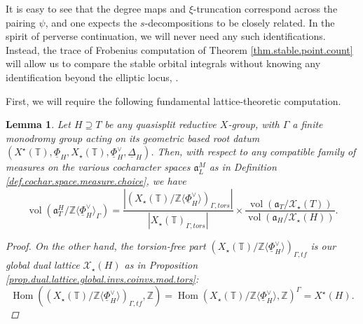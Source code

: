 \documentclass[openany]{amsbook}
\newtheorem{lemma}[theorem]{Lemma}
\theoremstyle{definition}
\theoremstyle{remark}
\numberwithin{equation}{section}
\newcommand{\Z}{\mathbb{Z}}
\newcommand{\T}{\mathbb{T}}
\newcommand{\cX}{\mathcal{X}}
\newcommand{\ul}[1]{\underline{#1}}
\newcommand{\vol}{\operatorname{vol}}
\renewcommand{\-}{\operatorname{-}}
\newcommand{\Hom}{\operatorname{Hom}}
\renewcommand{\a}{\mathfrak{a}}
\newcommand{\tors}{\mathit{tors}}
\newcommand{\tf}{\mathit{tf}}
\begin{document}
It is easy to see that the degree maps and $\xi$-truncation correspond across the pairing $\psi$, and one expects the $s$-decompositions to be closely related. In the spirit of perverse continuation, we will never need any such identifications. Instead, the trace of Frobenius computation of Theorem \ref{thm.stable.point.count} will allow us to compare the stable orbital integrals without knowing any identification beyond the elliptic locus, \cite[Th\'eor\`eme 8.8.2]{ngofl}.

First, we will require the following fundamental lattice-theoretic computation.

\begin{lemma}\label{lem.covol.coroots}
    Let $H \supseteq T$ be any quasisplit reductive $X$-group, with $\Gamma$ a finite monodromy group acting on its geometric based root datum $(X^\star(\T), \ul{\Phi}_H, X_\star(\T), \ul{\Phi}_H^\vee, \ul{\Delta}_H)$. Then, with respect to any compatible family of measures on the various cocharacter spaces $\a_{L}^M$ as in Definition \ref{def.cochar.space.measure.choice}, we have
    $$
        \vol(\a_{T}^H/\Z \langle \ul{\Phi}^\vee_H\rangle_\Gamma ) = \frac{|\left(X_\star(\T)/\Z\langle \ul{\Phi}^\vee_{H} \rangle\right)_{\Gamma, \tors}|}{|X_\star(\T)_{\Gamma, \tors}|}\times \frac{\vol(\a_T/\cX_\star(T))}{\vol(\a_H/\cX_\star(H))}.
    $$
    \begin{proof}
        On the other hand, the torsion-free part $(X_\star(\T)/\Z\langle \ul{\Phi}^\vee_{H} \rangle)_{\Gamma, \tf}$ is our global dual lattice $\cX_\star(H)$ as in Proposition \ref{prop.dual.lattice.global.invs.coinvs.mod.tors}:
        $$
            \Hom((X_\star(\T)/\Z\langle \ul{\Phi}^\vee_{H} \rangle)_{\Gamma, \tf}, \Z) = \Hom(X_\star(\T)/\Z\langle \ul{\Phi}^\vee_{H} \rangle, \Z)^{\Gamma} = X^\star(H).
        $$
        

\end{proof}
\end{lemma}
\end{document}
